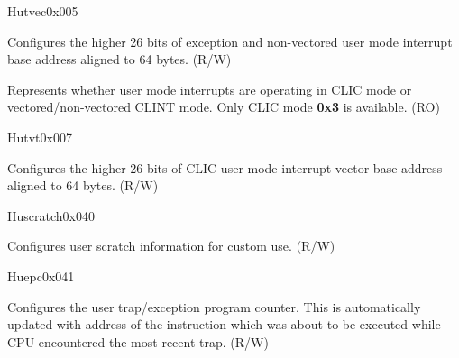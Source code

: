 \begin{register}{H}{utvec}{0x005}\label{regdesc:UTVEC}
%
%
%
\regnewline%
\begin{regdesc}\begin{reglist}
\label{fielddesc:UTVECBASE}\item [BASE] Configures the higher 26 bits of exception and non-vectored user mode interrupt base address aligned to 64 bytes. (R/W)
\label{fielddesc:UTVECMODE}\item [MODE] Represents whether user mode interrupts are operating in CLIC mode or vectored/non-vectored CLINT mode. Only CLIC mode \textbf{0x3} is available. (RO)
\end{reglist}\end{regdesc}
\end{register}

\begin{register}{H}{utvt}{0x007}\label{regdesc:UTVT}
%
%
\regnewline%
\begin{regdesc}\begin{reglist}
\label{fielddesc:UTVTBASE}\item [BASE] Configures the higher 26 bits of CLIC user mode interrupt vector base address aligned to 64 bytes. (R/W)
\end{reglist}\end{regdesc}
\end{register}

\begin{register}{H}{uscratch}{0x040}\label{regdesc:USCRATCH}
%
\regnewline%
\begin{regdesc}\begin{reglist}
\label{fielddesc:USCRATCH}\item [USCRATCH] Configures user scratch information for custom use. (R/W)
\end{reglist}\end{regdesc}
\end{register}

\begin{register}{H}{uepc}{0x041}\label{regdesc:UEPC}
%
\regnewline%
\begin{regdesc}\begin{reglist}
\label{fielddesc:UEPC}\item [UEPC] Configures the user trap/exception program counter. This is automatically updated with address of the instruction which was about to be executed while CPU encountered the most recent trap. (R/W)
\end{reglist}\end{regdesc}
\end{register}

